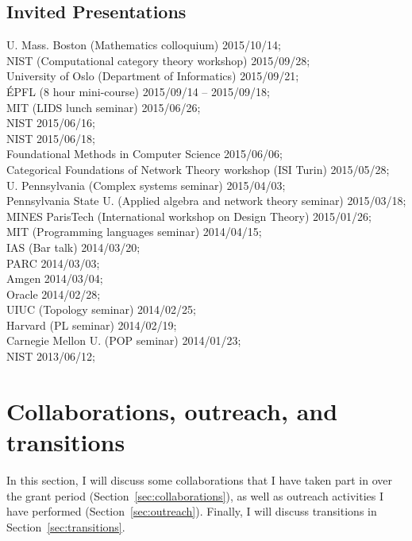 \documentclass[11pt,oneside,article]{memoir}
\begin{document}
\section{Invited Presentations}

U. Mass. Boston (Mathematics colloquium) 2015/10/14;\\
NIST (Computational category theory workshop) 2015/09/28;\\
University of Oslo (Department of Informatics) 2015/09/21;\\
\'{E}PFL (8 hour mini-course) 2015/09/14 -- 2015/09/18;\\
MIT (LIDS lunch seminar) 2015/06/26;\\
NIST 2015/06/16;\\
NIST 2015/06/18;\\
Foundational Methods in Computer Science 2015/06/06;\\
Categorical Foundations of Network Theory workshop (ISI Turin) 2015/05/28;\\
U. Pennsylvania (Complex systems seminar) 2015/04/03;\\
Pennsylvania State U. (Applied algebra and network theory seminar) 2015/03/18;\\
MINES ParisTech (International workshop on Design Theory) 2015/01/26;\\
MIT (Programming languages seminar) 2014/04/15;\\
IAS (Bar talk) 2014/03/20;\\
PARC 2014/03/03;\\
Amgen 2014/03/04;\\ 
Oracle 2014/02/28;\\
UIUC (Topology seminar) 2014/02/25;\\
Harvard (PL seminar) 2014/02/19;\\
Carnegie Mellon U. (POP seminar) 2014/01/23;\\
NIST 2013/06/12;\\


\chapter{Collaborations, outreach, and transitions}

In this section, I will discuss some collaborations that I have taken part in over the grant period (Section~\ref{sec:collaborations}), as well as outreach activities I have performed (Section~\ref{sec:outreach}). Finally, I will discuss transitions in Section~\ref{sec:transitions}.
\end{document}
